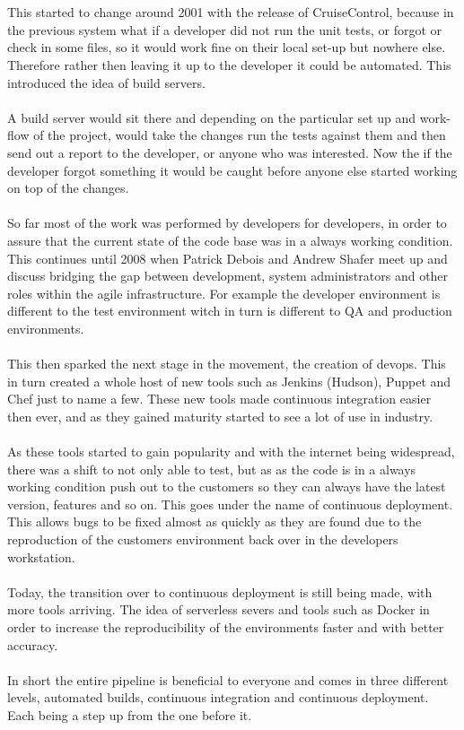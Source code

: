 \\\\
This started to change around 2001 with the release of CruiseControl, because in the previous system what if a developer did not run the unit tests, or forgot or check in some files, so it would work fine on their local set-up but nowhere else. Therefore rather then leaving it up to the developer it could be automated. This introduced the idea of build servers. 
\\\\
A build server would sit there and depending on the particular set up and work-flow of the project,  would take the changes run the tests against them and then send out a report to the developer, or anyone who was interested. Now the if the developer forgot something it would be caught before anyone else started working on top of the changes.
\\\\
So far most of the work was performed by developers for developers, in order to assure that the current state of the code base was in a always working condition. This continues until 2008 when Patrick Debois and Andrew Shafer meet up and discuss bridging the gap between development, system administrators and other roles within the agile infrastructure. For example the developer environment is different to the test environment witch in turn is different to QA and production environments. 
\\\\
This then sparked the next stage in the movement, the creation of devops. This in turn created a whole host of new tools such as Jenkins (Hudson), Puppet and Chef just to name a few. These new tools made continuous integration easier then ever, and as they gained maturity started to see a lot of use in industry.
\\\\
As these tools started to gain popularity and with the internet being widespread, there was a shift to not only able to test, but as as the code is in a always working condition push out to the customers so they can always have the latest version, features and so on. This goes under the name of continuous deployment. This allows bugs to be fixed almost as quickly as they are found due to the reproduction of the customers environment back over in the developers workstation.
\\\\
Today, the transition over to continuous deployment is still being made, with more tools arriving. The idea of serverless severs and tools such as Docker in order to increase the reproducibility of the environments faster and with better accuracy.
\\\\
In short the entire pipeline is beneficial to everyone and comes in three different levels, automated builds, continuous integration and continuous deployment. Each being a step up from the one before it. 

